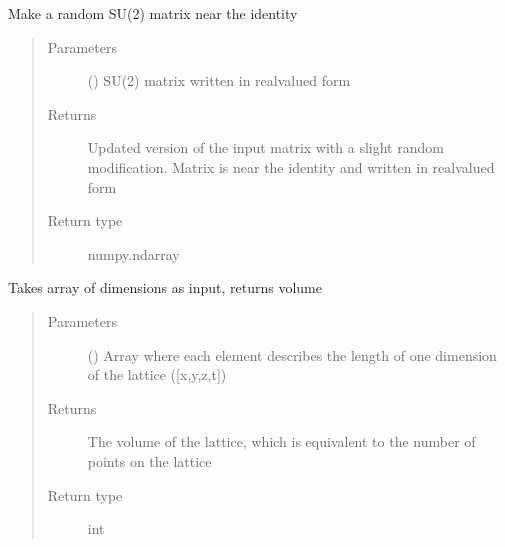\documentclass[letterpaper,10pt,english]{sphinxmanual}
\begin{document}
\begin{fulllineitems}
\label{\detokenize{index:su2.update}}
Make a random SU(2) matrix near the identity
\begin{quote}\begin{description}
\item[{Parameters}] \leavevmode
{} () \textendash{} SU(2) matrix written in real\sphinxhyphen{}valued form

\item[{Returns}] \leavevmode
Updated version of the input matrix with a slight random
modification. Matrix is near the identity and written in
real\sphinxhyphen{}valued form

\item[{Return type}] \leavevmode
numpy.ndarray

\end{description}\end{quote}

\end{fulllineitems}


\begin{fulllineitems}
\label{\detokenize{index:su2.vol}}
Takes array of dimensions as input, returns volume
\begin{quote}\begin{description}
\item[{Parameters}] \leavevmode
{} () \textendash{} Array where each element describes the length of one
dimension of the lattice ({[}x,y,z,t{]})

\item[{Returns}] \leavevmode
The volume of the lattice, which is equivalent to the number of
points on the lattice

\item[{Return type}] \leavevmode
int

\end{description}\end{quote}

\end{fulllineitems}
\end{document}
